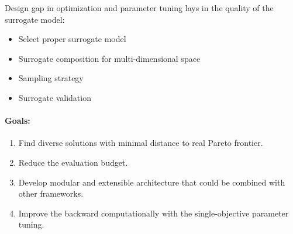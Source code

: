         Design gap in optimization and parameter tuning lays in the quality of the surrogate model:
            \begin{itemize} %
                \item Select proper surrogate model 
                \item Surrogate composition for multi-dimensional space
                \item Sampling strategy
                \item Surrogate validation
            \end{itemize}

        \paragraph{Goals:}
        \begin{enumerate}
            \item Find diverse solutions with minimal distance to real Pareto frontier.
            \item Reduce the evaluation budget.
            \item Develop modular and extensible architecture that could be combined with other frameworks. 
            \item Improve the backward computationally with the single-objective parameter tuning.
        \end{enumerate}








